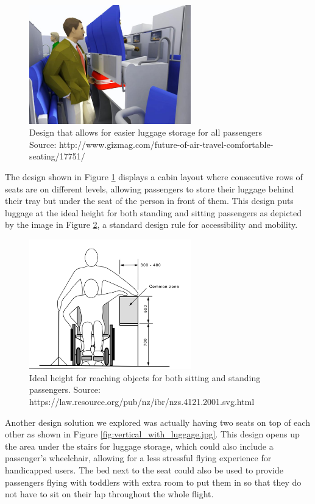 \begin{figure}[h]
  \centering
     \includegraphics[width=7cm]{images/luggage_trays.png}
   \caption{Design that allows for easier luggage storage for all passengers Source: http://www.gizmag.com/future-of-air-travel-comfortable-seating/17751/}
  \label{fig:luggage_trays.png}
\end{figure}  

The design shown in Figure \ref{fig:luggage_trays.png} displays a cabin layout where consecutive rows of seats are on different levels, allowing passengers to store their luggage behind their tray but under the seat of the person in front of them. This design puts luggage at the ideal height for both standing and sitting passengers as depicted by the image in Figure \ref{fig:correct_height.png}, a standard design rule for accessibility and mobility.  

\begin{figure}[h]
  \centering
     \includegraphics[width=7cm]{images/correct_height.png}
   \caption{Ideal height for reaching objects for both sitting and standing passengers. Source: https://law.resource.org/pub/nz/ibr/nzs.4121.2001.svg.html}
  \label{fig:correct_height.png}
\end{figure} 

Another design solution we explored was actually having two seats on top of each other as shown in Figure \ref{fig:vertical_with_luggage.jpg}. This design opens up the area under the stairs for luggage storage, which could also include a passenger’s wheelchair, allowing for a less stressful flying experience for handicapped users. The bed next to the seat could also be used to provide passengers flying with toddlers with extra room to put them in so that they do not have to sit on their lap throughout the whole flight. 

